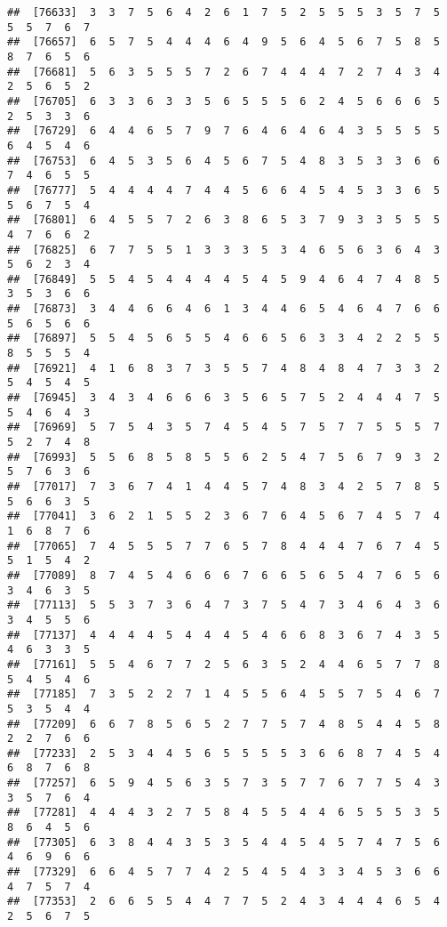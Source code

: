 \documentclass[
]{book}
\begin{document}
\begin{verbatim}
##  [76633]  3  3  7  5  6  4  2  6  1  7  5  2  5  5  5  3  5  7  5  5  5  7  6  7
##  [76657]  6  5  7  5  4  4  4  6  4  9  5  6  4  5  6  7  5  8  5  8  7  6  5  6
##  [76681]  5  6  3  5  5  5  7  2  6  7  4  4  4  7  2  7  4  3  4  2  5  6  5  2
##  [76705]  6  3  3  6  3  3  5  6  5  5  5  6  2  4  5  6  6  6  5  2  5  3  3  6
##  [76729]  6  4  4  6  5  7  9  7  6  4  6  4  6  4  3  5  5  5  5  6  4  5  4  6
##  [76753]  6  4  5  3  5  6  4  5  6  7  5  4  8  3  5  3  3  6  6  7  4  6  5  5
##  [76777]  5  4  4  4  4  7  4  4  5  6  6  4  5  4  5  3  3  6  5  5  6  7  5  4
##  [76801]  6  4  5  5  7  2  6  3  8  6  5  3  7  9  3  3  5  5  5  4  7  6  6  2
##  [76825]  6  7  7  5  5  1  3  3  3  5  3  4  6  5  6  3  6  4  3  5  6  2  3  4
##  [76849]  5  5  4  5  4  4  4  4  5  4  5  9  4  6  4  7  4  8  5  3  5  3  6  6
##  [76873]  3  4  4  6  6  4  6  1  3  4  4  6  5  4  6  4  7  6  6  5  6  5  6  6
##  [76897]  5  5  4  5  6  5  5  4  6  6  5  6  3  3  4  2  2  5  5  8  5  5  5  4
##  [76921]  4  1  6  8  3  7  3  5  5  7  4  8  4  8  4  7  3  3  2  5  4  5  4  5
##  [76945]  3  4  3  4  6  6  6  3  5  6  5  7  5  2  4  4  4  7  5  5  4  6  4  3
##  [76969]  5  7  5  4  3  5  7  4  5  4  5  7  5  7  7  5  5  5  7  5  2  7  4  8
##  [76993]  5  5  6  8  5  8  5  5  6  2  5  4  7  5  6  7  9  3  2  5  7  6  3  6
##  [77017]  7  3  6  7  4  1  4  4  5  7  4  8  3  4  2  5  7  8  5  5  6  6  3  5
##  [77041]  3  6  2  1  5  5  2  3  6  7  6  4  5  6  7  4  5  7  4  1  6  8  7  6
##  [77065]  7  4  5  5  5  7  7  6  5  7  8  4  4  4  7  6  7  4  5  5  1  5  4  2
##  [77089]  8  7  4  5  4  6  6  6  7  6  6  5  6  5  4  7  6  5  6  3  4  6  3  5
##  [77113]  5  5  3  7  3  6  4  7  3  7  5  4  7  3  4  6  4  3  6  3  4  5  5  6
##  [77137]  4  4  4  4  5  4  4  4  5  4  6  6  8  3  6  7  4  3  5  4  6  3  3  5
##  [77161]  5  5  4  6  7  7  2  5  6  3  5  2  4  4  6  5  7  7  8  5  4  5  4  6
##  [77185]  7  3  5  2  2  7  1  4  5  5  6  4  5  5  7  5  4  6  7  5  3  5  4  4
##  [77209]  6  6  7  8  5  6  5  2  7  7  5  7  4  8  5  4  4  5  8  2  2  7  6  6
##  [77233]  2  5  3  4  4  5  6  5  5  5  5  3  6  6  8  7  4  5  4  6  8  7  6  8
##  [77257]  6  5  9  4  5  6  3  5  7  3  5  7  7  6  7  7  5  4  3  3  5  7  6  4
##  [77281]  4  4  4  3  2  7  5  8  4  5  5  4  4  6  5  5  5  3  5  8  6  4  5  6
##  [77305]  6  3  8  4  4  3  5  3  5  4  4  5  4  5  7  4  7  5  6  4  6  9  6  6
##  [77329]  6  6  4  5  7  7  4  2  5  4  5  4  3  3  4  5  3  6  6  4  7  5  7  4
##  [77353]  2  6  6  5  5  4  4  7  7  5  2  4  3  4  4  4  6  5  4  2  5  6  7  5

\end{verbatim}
\end{document}
